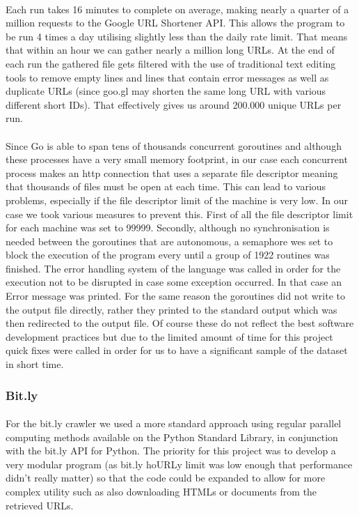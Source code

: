 \documentclass[12pt]{article}
\begin{document}
\paragraph{}
Each run takes 16 minutes to complete on average, making nearly a quarter of a million requests to the Google URL Shortener API. This allows the program to be run 4 times a day utilising slightly less than the daily rate limit. That means that within an hour we can gather nearly a million long URLs. At the end of each run the gathered file gets filtered with the use of traditional text editing tools to remove empty lines and lines that contain error messages as well as duplicate URLs (since goo.gl may shorten the same long URL with various different short IDs). That effectively gives us around 200.000 unique URLs per run. 

\paragraph{}
Since Go is able to span tens of thousands concurrent goroutines and although these processes have a very small memory footprint, in our case each concurrent process makes an http connection that uses a separate file descriptor meaning that thousands of files must be open at each time. This can lead to various problems, especially if the file descriptor limit of the machine is very low. In our case we took various measures to prevent this. First of all the file descriptor limit for each machine was set to 99999. Secondly, although no synchronisation is needed between the goroutines that are autonomous, a semaphore wes set to block the execution of the program every until a group of 1922 routines was finished. The error handling system of the language was called in order for the execution not to be disrupted in case some exception occurred. In that case an Error message was printed. For the same reason the goroutines did not write to the output file directly, rather they printed to the standard output which was then redirected to the output file. Of course these do not reflect the best software development practices but due to the limited amount of time for this project quick fixes were called in order for us to have a significant sample of the dataset in short time.  


\subsubsection{Bit.ly}

\paragraph{}
For the bit.ly crawler we used a more standard approach using regular parallel computing methods available on the Python Standard Library, in conjunction with the bit.ly API for Python. The priority for this project was to develop a very modular program (as bit.ly hoURLy limit was low enough that performance didn't really matter) so that the code could be expanded to allow for more complex utility such as also downloading HTMLs or documents from the retrieved URLs.
\end{document}
